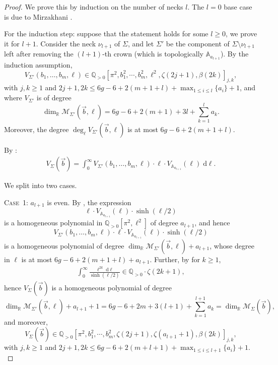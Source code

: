 \documentclass{amsart}
\renewcommand{\AA}{\mathbb{A}}
\newcommand{\QQ}{\mathbb{Q}}
\theoremstyle{definition}
\begin{document}
\begin{proof}
We prove this by induction on the number of necks $l$. The $l=0$ base case is due to Mirzakhani \cite[Theorem~1.1]{mirz_simp}.\medskip

For the induction step: suppose that the statement holds for some $l\geqslant 0$, we prove it for $l+1$. Consider the neck $\nu_{l+1}$ of $\Sigma$, and let $\Sigma'$ be the component of $\Sigma\setminus\nu_{l+1}$ left after removing the $(l+1)$-th crown (which is topologically $\AA_{a_{l+1}}$). By the induction assumption,
\[
V_{\Sigma'}(b_1,\dotsc,b_m,\ell) \in \QQ_{>0}[\pi^2,b_1^2,\cdots,b_m^2,\ell^2, \zeta(2j+1),\beta(2k)]_{j,k},
\]
with $j,k\geqslant1$ and $2j+1,2k \leqslant 6g-6+2(m+1+l)+\max_{1\leqslant i\leqslant l}\{a_i\}+1$, and where $V_{\Sigma'}$ is of degree
\[
\dim_{\mathbb{R}}\mathcal{M}_{\Sigma'}(\vec{b},\ell) =6g-6+2(m+1)+3l+\sum_{k=1}^l a_k.
\]
Moreover, the degree $\deg_{\ell} V_{\Sigma'}(\vec{b},\ell)$ is at most $6g-6+2(m+1+l)$.

By :
\begin{align}
V_{\Sigma}(\vec{b}) = \int_0^\infty V_{\Sigma'}(b_1,\dotsc,b_m,\ell)\cdot  
\ell \cdot V_{\mathbb{A}_{a_{l+1}}}(\ell)\;\mathrm{d}\ell.
\end{align}

We split into two cases.\medskip

\noindent\textsc{Case~1:} $a_{l+1}$ is even. By , the expression
\[
\ell \cdot V_{\mathbb{A}_{a_{l+1}}}(\ell)\cdot  \sinh (\ell/2)
\]
is a homogeneous polynomial in $\QQ_{>0}[\pi^2,\ell^2]$ of degree $a_{l+1}$, and hence
\[
V_{\Sigma'}(b_1,\dotsc,b_m,\ell)\cdot  \ell \cdot V_{\mathbb{A}_{a_{l+1}}}(\ell) \cdot \sinh(\ell/2)
\]
is a homogeneous polynomial of degree $\dim_{\mathbb{R}}\mathcal{M}_{\Sigma'}(\vec{b},\ell) +a_{l+1}$, whose degree in $\ell$ is at most $6g-6+2(m+1+l)+a_{l+1}$. Further, by  for $k\geqslant1$,
\begin{align}
\int_0^\infty
\frac{\ell^{2k}\;\mathrm{d}\ell}{\sinh(\ell/2)} \in \QQ_{>0} \cdot \zeta(2k+1), 
\end{align}
hence $V_{\Sigma}(\vec{b})$ is a homogeneous polynomial of degree
\[
\dim_{\mathbb{R}}\mathcal{M}_{\Sigma'}(\vec{b},\ell) +a_{l+1}+1 = 6g-6+2m+3(l+1)+\sum_{k=1}^{l+1} a_k = \dim_{\mathbb{R}}\mathcal{M}_{\Sigma}(\vec{b}),
\]
and moreover, 
\[
V_{\Sigma}(\vec{b}) \in \QQ_{>0}[\pi^2, b_1^2,\cdots,b_m^2, \zeta(2j+1),\zeta(a_{l+1}+1),\beta(2k)]_{j,k},
\]
with $j,k\geqslant1$ and $2j+1,2k \leqslant  6g-6+2(m+l+1)+\max_{1\leqslant i\leqslant l+1}\{a_i\}+1$.\\


\end{proof}
\end{document}
